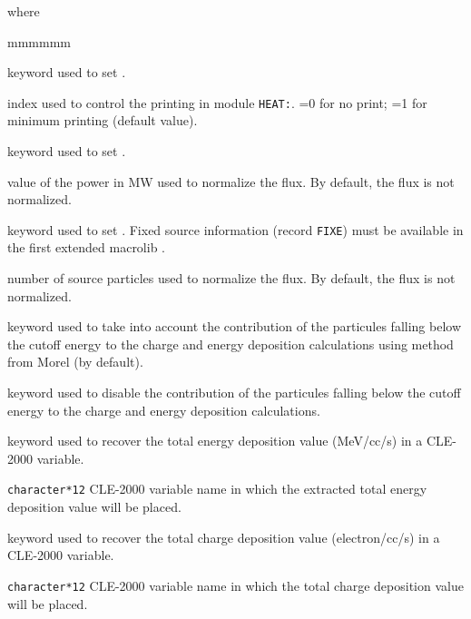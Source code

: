 \noindent where
\begin{ListeDeDescription}{mmmmmm}

\item[\moc{EDIT}] keyword used to set .

\item[\dusa{iprint}] index used to control the printing in module {\tt HEAT:}. =0 for no print; =1 for minimum printing (default value).

\item[\moc{POWR}] keyword used to set .

\item[\dusa{power}] value of the power in MW used to normalize the flux. By default, the flux is not normalized.

\item[\moc{SOUR}] keyword used to set . Fixed source information (record {\tt FIXE}) must be available in the first extended macrolib .

\item[\dusa{snumb}] number of source particles used to normalize the flux. By default, the flux is not normalized.

\item[\moc{BC}]  keyword used to take into account the contribution of the particules falling below the cutoff energy to the charge and energy deposition calculations using method from Morel\cite{morel1996} (by default).

\item[\moc{NBC}] keyword used to disable the contribution of the particules falling below the cutoff energy to the charge and energy deposition calculations.

\item[\moc{PICKE}]  keyword used to recover the total energy deposition value (MeV/cc/s) in a CLE-2000 variable.

\item[\dusa{esum}] \texttt{character*12} CLE-2000 variable name in which the extracted total energy deposition value will be placed.

\item[\moc{PICKC}]  keyword used to recover the total charge deposition value (electron/cc/s) in a CLE-2000 variable.

\item[\dusa{csum}] \texttt{character*12} CLE-2000 variable name in which the total charge deposition value will be placed.

\end{ListeDeDescription}
\clearpage
